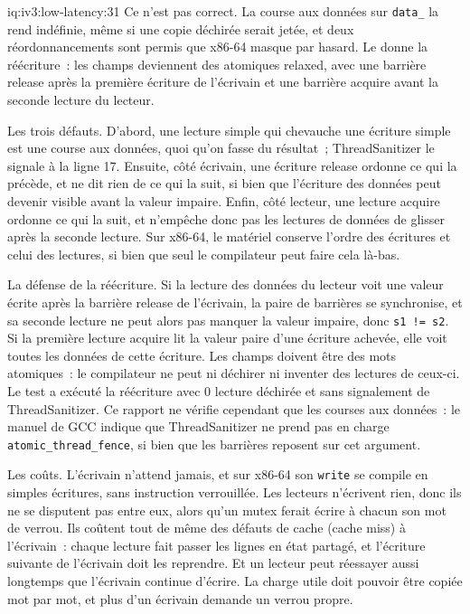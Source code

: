 \begin{solution}{iq:iv3:low-latency:31}
Ce n'est pas correct. La course aux données sur \texttt{data\_} la rend indéfinie, même si une copie déchirée serait jetée, et deux réordonnancements sont permis que x86-64 masque par hasard. Le  donne la réécriture~: les champs deviennent des atomiques relaxed, avec une barrière release après la première écriture de l'écrivain et une barrière acquire avant la seconde lecture du lecteur.
\label{lst:iv3:ll:seqfixed}

Les trois défauts. D'abord, une lecture simple qui chevauche une écriture simple est une course aux données, quoi qu'on fasse du résultat~; ThreadSanitizer le signale à la ligne 17. Ensuite, côté écrivain, une écriture release ordonne ce qui la précède, et ne dit rien de ce qui la suit, si bien que l'écriture des données peut devenir visible avant la valeur impaire. Enfin, côté lecteur, une lecture acquire ordonne ce qui la suit, et n'empêche donc pas les lectures de données de glisser après la seconde lecture. Sur x86-64, le matériel conserve l'ordre des écritures et celui des lectures, si bien que seul le compilateur peut faire cela là-bas.

La défense de la réécriture. Si la lecture des données du lecteur voit une valeur écrite après la barrière release de l'écrivain, la paire de barrières se synchronise, et sa seconde lecture ne peut alors pas manquer la valeur impaire, donc \texttt{s1 != s2}. Si la première lecture acquire lit la valeur paire d'une écriture achevée, elle voit toutes les données de cette écriture. Les champs doivent être des mots atomiques~: le compilateur ne peut ni déchirer ni inventer des lectures de ceux-ci. Le test a exécuté la réécriture avec 0 lecture déchirée et sans signalement de ThreadSanitizer. Ce rapport ne vérifie cependant que les courses aux données~: le manuel de GCC indique que ThreadSanitizer ne prend pas en charge \texttt{atomic\_thread\_fence}, si bien que les barrières reposent sur cet argument.

Les coûts. L'écrivain n'attend jamais, et sur x86-64 son \texttt{write} se compile en simples écritures, sans instruction verrouillée. Les lecteurs n'écrivent rien, donc ils ne se disputent pas entre eux, alors qu'un mutex ferait écrire à chacun son mot de verrou. Ils coûtent tout de même des défauts de cache (cache miss) à l'écrivain~: chaque lecture fait passer les lignes en état partagé, et l'écriture suivante de l'écrivain doit les reprendre. Et un lecteur peut réessayer aussi longtemps que l'écrivain continue d'écrire. La charge utile doit pouvoir être copiée mot par mot, et plus d'un écrivain demande un verrou propre.

\end{solution}

